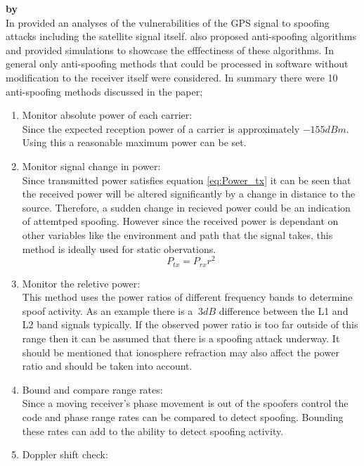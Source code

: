 \textbf{\emph{} by \citeauthor{RN11}} \\
In \citeyear{RN11} \citeauthor{RN11} \cite{RN11} provided an analyses of the vulnerabilities of the GPS signal to spoofing attacks including the
satellite signal itself. \citeauthor{RN11} also proposed anti-spoofing algorithms and provided simulations to showcase the efffectiness of these
algorithms. In general only anti-spoofing methods that could be processed in software without modification to the receiver itself were considered.
In summary there were 10 anti-spoofing methods discussed in the paper;  
\begin{enumerate}
    \item Monitor absolute power of each carrier: \\
    Since the expected reception power of a carrier is approximately $-155 dBm$. Using this a reasonable maximum power
    can be set.
    \item Monitor signal change in power: \\
    Since transmitted power satisfies equation \ref{eq:Power_tx} it can be seen that the received power will be altered significantly by a change in
    distance to the source. Therefore, a sudden change in recieved power could be an indication of attemtped spoofing. However since the received power
    is dependant on other variables like the environment and path that the signal takes, this method is ideally used for static obervations.
    \begin{equation} \label{eq:Power_tx}
        P_{tx}=P_{rx}r^2
    \end{equation}
    \item Monitor the reletive power: \\
    This method uses the power ratios of different frequency bands to determine spoof activity. As an example there is a $~3dB$ difference between
    the L1 and L2 band signals typically. If the observed power ratio is too far outside of this range then it can be assumed that there is a spoofing
    attack underway. It should be mentioned that ionosphere refraction may also affect the power ratio and should be taken into account.
    \item Bound and compare range rates: \\ 
    Since a moving receiver's phase movement is out of the spoofers control the code and phase range rates can be compared to detect spoofing. 
    Bounding these rates can add to the ability to detect spoofing activity.
    \item Doppler shift check: \\

\end{enumerate}
